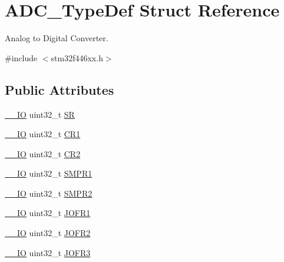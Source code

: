 \hypertarget{struct_a_d_c___type_def}{}\section{A\+D\+C\+\_\+\+Type\+Def Struct Reference}
\label{struct_a_d_c___type_def}


Analog to Digital Converter.  




{\ttfamily \#include $<$stm32f446xx.\+h$>$}

\subsection*{Public Attributes}
\begin{DoxyCompactItemize}
\item 
\hyperlink{core__sc300_8h_aec43007d9998a0a0e01faede4133d6be}{\+\_\+\+\_\+\+IO} uint32\+\_\+t \hyperlink{struct_a_d_c___type_def_a9745df96e98f3cdc2d05ccefce681f64}{SR}
\item 
\hyperlink{core__sc300_8h_aec43007d9998a0a0e01faede4133d6be}{\+\_\+\+\_\+\+IO} uint32\+\_\+t \hyperlink{struct_a_d_c___type_def_a89b1ff4376683dd2896ea8b32ded05b2}{C\+R1}
\item 
\hyperlink{core__sc300_8h_aec43007d9998a0a0e01faede4133d6be}{\+\_\+\+\_\+\+IO} uint32\+\_\+t \hyperlink{struct_a_d_c___type_def_a1053a65a21af0d27afe1bf9cf7b7aca7}{C\+R2}
\item 
\hyperlink{core__sc300_8h_aec43007d9998a0a0e01faede4133d6be}{\+\_\+\+\_\+\+IO} uint32\+\_\+t \hyperlink{struct_a_d_c___type_def_a73009a8122fcc628f467a4e997109347}{S\+M\+P\+R1}
\item 
\hyperlink{core__sc300_8h_aec43007d9998a0a0e01faede4133d6be}{\+\_\+\+\_\+\+IO} uint32\+\_\+t \hyperlink{struct_a_d_c___type_def_a9e68fe36c4c8fbbac294b5496ccf7130}{S\+M\+P\+R2}
\item 
\hyperlink{core__sc300_8h_aec43007d9998a0a0e01faede4133d6be}{\+\_\+\+\_\+\+IO} uint32\+\_\+t \hyperlink{struct_a_d_c___type_def_aa005e656f528aaad28d70d61c9db9b81}{J\+O\+F\+R1}
\item 
\hyperlink{core__sc300_8h_aec43007d9998a0a0e01faede4133d6be}{\+\_\+\+\_\+\+IO} uint32\+\_\+t \hyperlink{struct_a_d_c___type_def_aa20f76044c11042dde41c1060853fb82}{J\+O\+F\+R2}
\item 
\hyperlink{core__sc300_8h_aec43007d9998a0a0e01faede4133d6be}{\+\_\+\+\_\+\+IO} uint32\+\_\+t \hyperlink{struct_a_d_c___type_def_ae9c78142f6edf8122384263878d09015}{J\+O\+F\+R3}

\end{DoxyCompactItemize}

